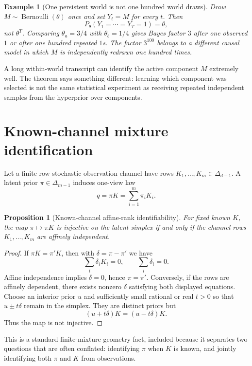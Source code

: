 \documentclass[11pt]{article}
\newtheorem{proposition}{Proposition}
\newtheorem{example}{Example}
\begin{document}
\begin{example}[One persistent world is not one hundred world draws]\label{ex:persistent}
Draw $M\sim\operatorname{Bernoulli}(\theta)$ once and set $Y_t=M$ for every $t$. Then
\[
P_\theta(Y_1=\cdots=Y_T=1)=\theta,
\]
not $\theta^T$. Comparing $\theta_a=3/4$ with $\theta_b=1/4$ gives Bayes factor $3$ after one observed $1$ or after one hundred repeated $1$s. The factor $3^{100}$ belongs to a different causal model in which $M$ is independently redrawn one hundred times.
\end{example}

A long within-world transcript can identify the active component $M$ extremely well. The theorem says something different: learning which component was selected is not the same statistical experiment as receiving repeated independent samples from the hyperprior over components.

\section{Known-channel mixture identification}
Let a finite row-stochastic observation channel have rows $K_1,\ldots,K_m\in\Delta_{d-1}$. A latent prior $\pi\in\Delta_{m-1}$ induces one-view law
\[
q=\pi K=\sum_{i=1}^m\pi_iK_i.
\]

\begin{proposition}[Known-channel affine-rank identifiability]\label{prop:affine}
For fixed known $K$, the map $\pi\mapsto\pi K$ is injective on the latent simplex if and only if the channel rows $K_1,\ldots,K_m$ are affinely independent.
\end{proposition}

\begin{proof}
If $\pi K=\pi'K$, then with $\delta=\pi-\pi'$ we have
\[
\sum_i\delta_iK_i=0,\qquad \sum_i\delta_i=0.
\]
Affine independence implies $\delta=0$, hence $\pi=\pi'$. Conversely, if the rows are affinely dependent, there exists nonzero $\delta$ satisfying both displayed equations. Choose an interior prior $u$ and sufficiently small rational or real $t>0$ so that $u\pm t\delta$ remain in the simplex. They are distinct priors but
\[
(u+t\delta)K=(u-t\delta)K.
\]
Thus the map is not injective.
\end{proof}

This is a standard finite-mixture geometry fact, included because it separates two questions that are often conflated: identifying $\pi$ when $K$ is known, and jointly identifying both $\pi$ and $K$ from observations.
\end{document}
